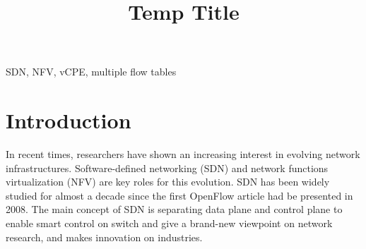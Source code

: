 \documentclass[conference]{IEEEtran}
\begin{document}
\title{Temp Title}

\author{

}

\maketitle

\begin{abstract}
\end{abstract}

\begin{IEEEkeywords}
SDN, NFV, vCPE, multiple flow tables
\end{IEEEkeywords}

\IEEEpeerreviewmaketitle{}





\section{Introduction}
In recent times, researchers have shown an increasing interest in evolving network infrastructures.
Software-defined networking (SDN) and network functions virtualization (NFV) are key roles for this evolution.
SDN \cite{sdn-mckeown-2009-talk, sdn-newnorm, sdn-road, sdn-compre-survey} has been widely studied for almost a decade since the first OpenFlow \cite{openflow-mckeown-2008, openflow-spec} article had be presented in 2008.
The main concept of SDN is separating data plane and control plane to enable smart control on switch and give a brand-new viewpoint on network research, and makes innovation on industries.
\end{document}
